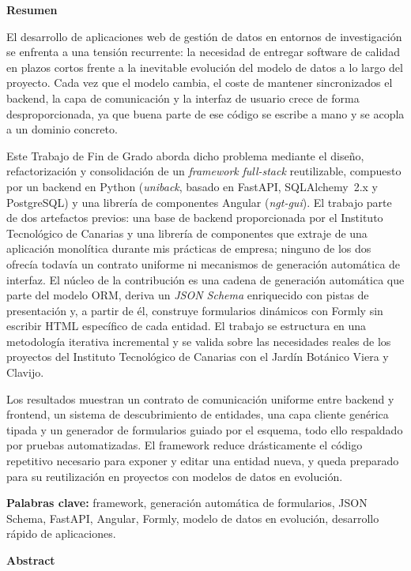 {\setlength{\parskip}{4mm}
{\huge{\textbf{Resumen}}}

El desarrollo de aplicaciones web de gestión de datos en entornos de
investigación se enfrenta a una tensión recurrente: la necesidad de entregar
software de calidad en plazos cortos frente a la inevitable evolución del
modelo de datos a lo largo del proyecto. Cada vez que el modelo cambia, el
coste de mantener sincronizados el backend, la capa de comunicación y la
interfaz de usuario crece de forma desproporcionada, ya que buena parte de ese
código se escribe a mano y se acopla a un dominio concreto.

Este Trabajo de Fin de Grado aborda dicho problema mediante el diseño,
refactorización y consolidación de un \emph{framework} \emph{full-stack}
reutilizable, compuesto por un backend en Python (\emph{uniback}, basado en
FastAPI, SQLAlchemy~2.x y PostgreSQL) y una librería de componentes Angular
(\emph{ngt-gui}). El trabajo parte de dos artefactos previos: una base de
backend proporcionada por el Instituto Tecnológico de Canarias y una librería
de componentes que extraje de una aplicación monolítica durante mis prácticas
de empresa; ninguno de los dos ofrecía todavía un contrato
uniforme ni mecanismos de generación automática de interfaz. El núcleo de la
contribución es una cadena de generación
automática que parte del modelo ORM, deriva un \emph{JSON Schema} enriquecido
con pistas de presentación y, a partir de él, construye formularios dinámicos
con Formly sin escribir HTML específico de cada entidad. El trabajo se
estructura en una metodología iterativa incremental y se valida sobre las
necesidades reales de los proyectos del Instituto Tecnológico de Canarias con
el Jardín Botánico Viera y Clavijo.

Los resultados muestran un contrato de comunicación uniforme entre backend y
frontend, un sistema de descubrimiento de entidades, una capa cliente
genérica tipada y un generador de formularios guiado por el esquema, todo ello
respaldado por pruebas automatizadas. El framework reduce drásticamente el
código repetitivo necesario para exponer y editar una entidad nueva, y queda
preparado para su reutilización en proyectos con modelos de datos en
evolución.

\textbf{Palabras clave:} framework, generación automática de formularios,
JSON Schema, FastAPI, Angular, Formly, modelo de datos en evolución, desarrollo
rápido de aplicaciones.

\newpage

{\huge{\textbf{Abstract}}}

}
